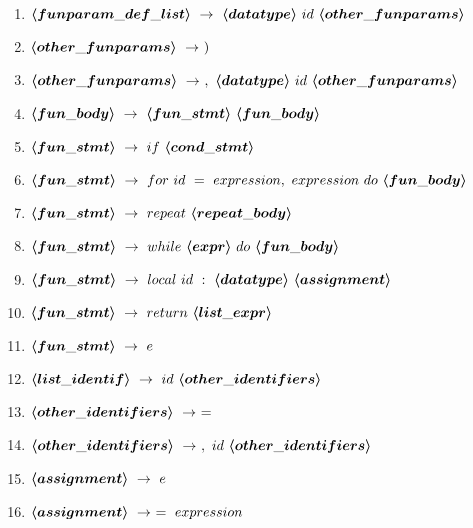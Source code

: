\begin{enumerate}
	\item $\mbox{\boldmath$\langle{}funparam\_def\_list\rangle{}$}\ \rightarrow\ \mbox{\boldmath$\langle{}datatype\rangle{}$}\ id\ \mbox{\boldmath$\langle{}other\_funparams\rangle{}$}$
	\item $\mbox{\boldmath$\langle{}other\_funparams\rangle{}$}\ \rightarrow\ )$
	\item $\mbox{\boldmath$\langle{}other\_funparams\rangle{}$}\ \rightarrow\ ,\ \mbox{\boldmath$\langle{}datatype\rangle{}$}\ id\ \mbox{\boldmath$\langle{}other\_funparams\rangle{}$}$
	\item $\mbox{\boldmath$\langle{}fun\_body\rangle{}$}\ \rightarrow\ \mbox{\boldmath$\langle{}fun\_stmt\rangle{}$}\ \mbox{\boldmath$\langle{}fun\_body\rangle{}$}$
	\item $\mbox{\boldmath$\langle{}fun\_stmt\rangle{}$}\ \rightarrow\ if\ \mbox{\boldmath$\langle{}cond\_stmt\rangle{}$}$
	\item $\mbox{\boldmath$\langle{}fun\_stmt\rangle{}$}\ \rightarrow\ for\ id\ =\ expression,\ expression\ do\ \mbox{\boldmath$\langle{}fun\_body\rangle{}$}$
	\item $\mbox{\boldmath$\langle{}fun\_stmt\rangle{}$}\ \rightarrow\ repeat\ \mbox{\boldmath$\langle{}repeat\_body\rangle{}$}$
	\item $\mbox{\boldmath$\langle{}fun\_stmt\rangle{}$}\ \rightarrow\ while\ \mbox{\boldmath$\langle{}expr\rangle{}$}\ do\ \mbox{\boldmath$\langle{}fun\_body\rangle{}$}$
	\item $\mbox{\boldmath$\langle{}fun\_stmt\rangle{}$}\ \rightarrow\ local\ id\ :\ \mbox{\boldmath$\langle{}datatype\rangle{}$}\ \mbox{\boldmath$\langle{}assignment\rangle{}$}$
	\item $\mbox{\boldmath$\langle{}fun\_stmt\rangle{}$}\ \rightarrow\ return\ \mbox{\boldmath$\langle{}list\_expr\rangle{}$}$
	\item $\mbox{\boldmath$\langle{}fun\_stmt\rangle{}$}\ \rightarrow\ e$
	\item $\mbox{\boldmath$\langle{}list\_identif\rangle{}$}\ \rightarrow\ id\ \mbox{\boldmath$\langle{}other\_identifiers\rangle{}$}$
	\item $\mbox{\boldmath$\langle{}other\_identifiers\rangle{}$}\ \rightarrow\ =$
	\item $\mbox{\boldmath$\langle{}other\_identifiers\rangle{}$}\ \rightarrow\ ,\ id\ \mbox{\boldmath$\langle{}other\_identifiers\rangle{}$}$
	\item $\mbox{\boldmath$\langle{}assignment\rangle{}$}\ \rightarrow\ e$
	\item $\mbox{\boldmath$\langle{}assignment\rangle{}$}\ \rightarrow\ =\ expression$

\end{enumerate}
